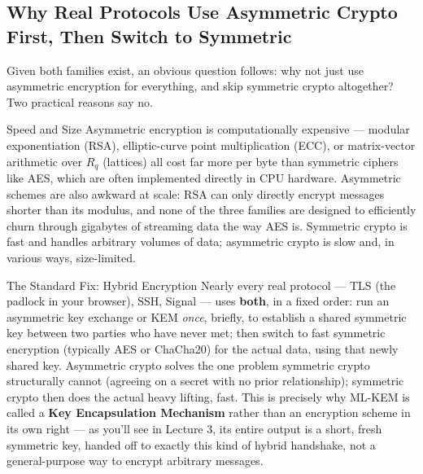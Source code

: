 \subsection{Why Real Protocols Use Asymmetric Crypto First, Then Switch to Symmetric}
\label{sec:L2:why-real-protocols-switch-to-symmetric}

Given both families exist, an obvious question follows: why not just use asymmetric encryption for everything, and skip symmetric crypto altogether? Two practical reasons say no.

\begin{rmkbox}{Speed and Size}
Asymmetric encryption is computationally expensive --- modular exponentiation (RSA), elliptic-curve point multiplication (ECC), or matrix-vector arithmetic over $R_q$ (lattices) all cost far more per byte than symmetric ciphers like AES, which are often implemented directly in CPU hardware. Asymmetric schemes are also awkward at scale: RSA can only directly encrypt messages shorter than its modulus, and none of the three families are designed to efficiently churn through gigabytes of streaming data the way AES is. Symmetric crypto is fast and handles arbitrary volumes of data; asymmetric crypto is slow and, in various ways, size-limited.
\end{rmkbox}

\begin{rmkbox}{The Standard Fix: Hybrid Encryption}
Nearly every real protocol --- TLS (the padlock in your browser), SSH, Signal --- uses \textbf{both}, in a fixed order: run an asymmetric key exchange or KEM \emph{once}, briefly, to establish a shared symmetric key between two parties who have never met; then switch to fast symmetric encryption (typically AES or ChaCha20) for the actual data, using that newly shared key. Asymmetric crypto solves the one problem symmetric crypto structurally cannot (agreeing on a secret with no prior relationship); symmetric crypto then does the actual heavy lifting, fast. This is precisely why ML-KEM is called a \textbf{Key Encapsulation Mechanism} rather than an encryption scheme in its own right --- as you'll see in Lecture 3, its entire output is a short, fresh symmetric key, handed off to exactly this kind of hybrid handshake, not a general-purpose way to encrypt arbitrary messages.
\end{rmkbox}

